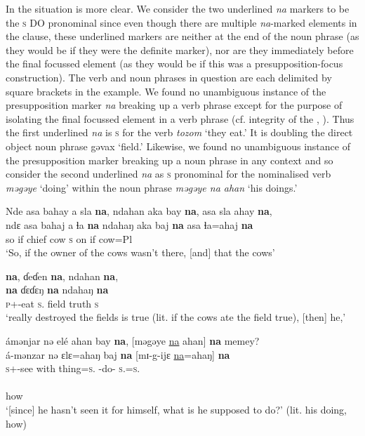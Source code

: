 In   the situation is more clear. We consider the two underlined \textit{na}  markers to be the \textsc{s} DO pronominal since even though there are multiple \textit{na}{}-marked elements in the clause, these underlined markers are neither at the end of the noun phrase (as they would be if they were the definite marker), nor are they immediately before the final focussed element (as they would be if this was a presupposition-focus construction). The verb and noun phrases in question are each delimited by square brackets in the example. We found no unambiguous instance of the presupposition marker \textit{na} breaking up a verb phrase except for the purpose of isolating the final focussed element in a verb phrase (cf. integrity of the \VP, ). Thus the first underlined \textit{na}  is \textsc{s} \DO for the verb \textit{tozom} ‘they eat.’ It is doubling the direct object noun phrase gəvax ‘field.' Likewise, we found no unambiguous instance of the presupposition marker breaking up a noun phrase in any context and so consider the second underlined \textit{na} as \textsc{s} \DO pronominal for the nominalised verb \textit{məgəye} ‘doing’ within the noun phrase \textit{məgəye na ahan} ‘his doings.’  


\ea \label{ex:11:53}
Nde  asa  bahay  a  sla  \textbf{na},  ndahan  aka  bay  \textbf{na}, asa  sla  ahay  \textbf{na},\\ 
\gll  ndɛ  asa   bahaj  a  ɬa  \textbf{na}  ndahaŋ  aka   baj  \textbf{na} asa ɬa=ahaj \textbf{na}\\ 
      so  if  chief  {\GEN}  cow  {\PSP}  \textsc{s}  on  {\NEG}  {\PSP} if  cow=Pl  {\PSP} \\ 
\glt ‘So, if the owner of the cows wasn’t there, [and] that the cows’ 

  \textbf{na},  ɗeɗen  \textbf{na},  ndahan  \textbf{na},\\  
 \textbf{na} {ɗɛɗɛŋ} \textbf{na} {ndahaŋ} \textbf{na}\\  
     \textsc{p}+{\PFV}-eat  \textsc{s}.{\DO}  field  {\PSP}  truth  {\PSP} \textsc{s} {\PSP} \\ 
\glt ‘really destroyed the fields  is true (lit. if the cows ate the field true), [then] he,’

\medskip
ámənjar  nə  elé  ahan  bay  \textbf{na},  [məgəye  \underline{na}  ahan]  \textbf{na}  memey?\\
\gll á-mənzar nə ɛlɛ=ahaŋ baj \textbf{na} [{mɪ-g-ijɛ} \underline{na}{=ahaŋ}] \textbf{na}\\ 
     \textsc{s}+{\IFV}-see  with  thing=\textsc{s}.{\POSS}  {\NEG}  {\PSP} {\NOM}-do{}-{\CL} \textsc{s}.{\DO}=\textsc{s}.{\POSS}  {\PSP}\\  
     
     \medskip
{}\\
     how\\
\glt  ‘[since] he hasn’t seen it for himself, what is he supposed to do?’ (lit. his doing, how)
\z
{}